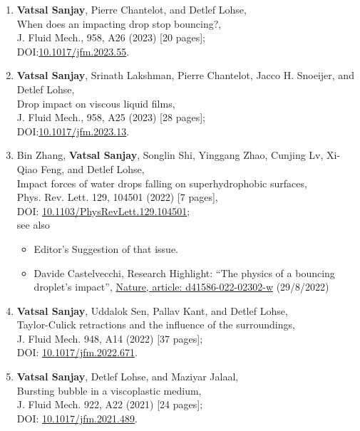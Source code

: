 \documentclass[11pt,a4paper,roman,english,colorlinks,linkcolor=true]{moderncv}
\begin{document}
\begin{enumerate}[leftmargin=2.5cm]
	\item \textbf{Vatsal Sanjay}, Pierre Chantelot, and Detlef Lohse,\\
	When does an impacting drop stop bouncing?,\\
	J. Fluid Mech., 958, A26 (2023) [20 pages];\\
	DOI:\href{https://doi.org/10.1017/jfm.2023.55}{10.1017/jfm.2023.55}.
	
	\item \textbf{Vatsal Sanjay}, Srinath Lakshman, Pierre Chantelot, Jacco H. Snoeijer, and Detlef Lohse,\\
	Drop impact on viscous liquid films,\\
	J. Fluid Mech., 958, A25 (2023) [28 pages];\\
	DOI:\href{https://doi.org/10.1017/jfm.2023.13}{10.1017/jfm.2023.13}.	
	
	\item Bin Zhang, \textbf{Vatsal Sanjay}, Songlin Shi,  Yinggang Zhao,  Cunjing Lv,  Xi-Qiao Feng,  and Detlef Lohse,\\
	Impact forces of water drops falling on superhydrophobic surfaces,\\
	Phys. Rev. Lett. 129, 104501 (2022) [7 pages],\\
	DOI: \href{https://doi.org/10.1103/PhysRevLett.129.104501}{10.1103/PhysRevLett.129.104501};\\
	see also
	\begin{itemize}
		\item
		Editor's Suggestion of that issue. 
		\item
		Davide Castelvecchi, Research Highlight: ``The physics of a bouncing droplet's impact'', \href{https://www.nature.com/articles/d41586-022-02302-w}{Nature, article: d41586-022-02302-w} (29/8/2022)
	\end{itemize}
	\item \textbf{Vatsal Sanjay}, Uddalok Sen, Pallav Kant, and Detlef Lohse,\\
	Taylor-Culick retractions and the influence of the surroundings,\\
	J. Fluid Mech. 948, A14  (2022) [37 pages];\\
	DOI: \href{https://doi.org/10.1017/jfm.2022.671}{10.1017/jfm.2022.671}.
	\item \textbf{Vatsal Sanjay}, Detlef Lohse, and Maziyar Jalaal,\\
	Bursting bubble in a viscoplastic medium,\\
	J. Fluid Mech. 922, A22  (2021) [24 pages];\\
	DOI: \href{https://doi.org/10.1017/jfm.2021.489}{10.1017/jfm.2021.489}.
	

\end{enumerate}
\end{document}
